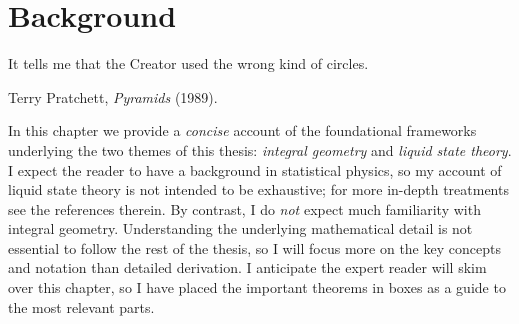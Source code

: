 \documentclass[11pt,twoside]{report}
\def\includebibliography{}
\begin{document}
\chapter{Background}
\epigraph{It tells me that the Creator used the wrong kind of circles.}{Terry Pratchett, \emph{Pyramids} (1989).}

In this chapter we provide a \emph{concise} account of the foundational frameworks underlying the two themes of this thesis: \emph{integral geometry} and \emph{liquid state theory}.
I expect the reader to have a background in statistical physics, so my account of liquid state theory is not intended to be exhaustive; for more in-depth treatments see the references therein.
By contrast, I do \emph{not} expect much familiarity with integral geometry.
Understanding the underlying mathematical detail is not essential to follow the rest of the thesis, so I will focus more on the key concepts and notation than detailed derivation.
I anticipate the expert reader will skim over this chapter, so I have placed the important theorems in boxes as a guide to the most relevant parts.




%

\ifdefined\includebibliography
  \printbibliography
\fi
\end{document}
